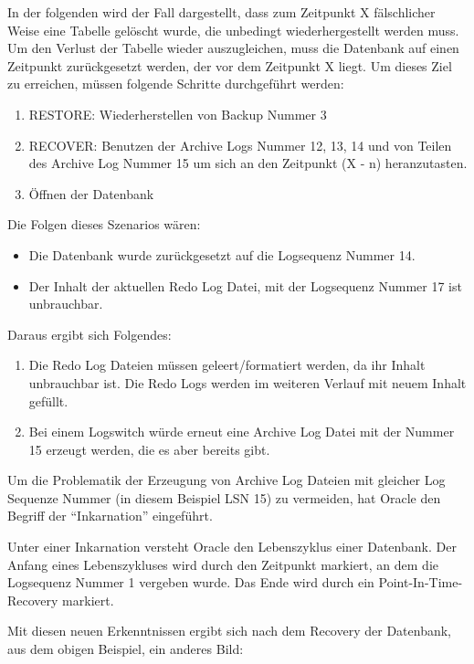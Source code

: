         In der folgenden  wird der Fall dargestellt, dass zum Zeitpunkt X f\"alschlicher Weise eine Tabelle gel\"oscht wurde, die unbedingt wiederhergestellt werden muss.
        Um den Verlust der Tabelle wieder auszugleichen, muss die Datenbank auf einen Zeitpunkt zur\"uckgesetzt werden, der vor dem Zeitpunkt X liegt.
        Um dieses Ziel zu erreichen, m\"ussen folgende Schritte durchgef\"uhrt
        werden:
        \begin{enumerate}
          \item RESTORE: Wiederherstellen von Backup Nummer 3
          \item RECOVER: Benutzen der Archive Logs Nummer 12, 13, 14 und von Teilen des Archive Log Nummer 15 um sich an den Zeitpunkt (X - n) heranzutasten.
          \item \"Offnen der Datenbank
        \end{enumerate}
        Die Folgen dieses Szenarios w\"aren:
        \begin{itemize}
          \item Die Datenbank wurde zur\"uckgesetzt auf die Logsequenz Nummer 14.
          \item Der Inhalt der aktuellen Redo Log Datei, mit der Logsequenz Nummer 17 ist unbrauchbar.
        \end{itemize}
        Daraus ergibt sich Folgendes:
        \begin{enumerate}
          \item Die Redo Log Dateien m\"ussen geleert/formatiert werden, da ihr Inhalt unbrauchbar ist. Die Redo Logs werden im weiteren Verlauf mit neuem Inhalt gef\"ullt.
          \item Bei einem Logswitch w\"urde erneut eine Archive Log Datei mit der Nummer 15 erzeugt werden, die es aber bereits gibt.
        \end{enumerate}
        Um die Problematik der Erzeugung von Archive Log Dateien mit gleicher Log Sequenze Nummer (in diesem Beispiel LSN 15) zu vermeiden, hat Oracle den Begriff der \enquote{Inkarnation} eingef\"uhrt.
        \begin{merke}
          Unter einer Inkarnation versteht Oracle den Lebenszyklus einer Datenbank. Der Anfang eines Lebenszykluses wird durch den Zeitpunkt markiert, an dem die Logsequenz Nummer 1 vergeben wurde. Das Ende wird durch ein Point-In-Time-Recovery markiert.
        \end{merke}
        Mit diesen neuen Erkenntnissen ergibt sich nach dem Recovery der Datenbank, aus dem obigen Beispiel, ein anderes Bild:

